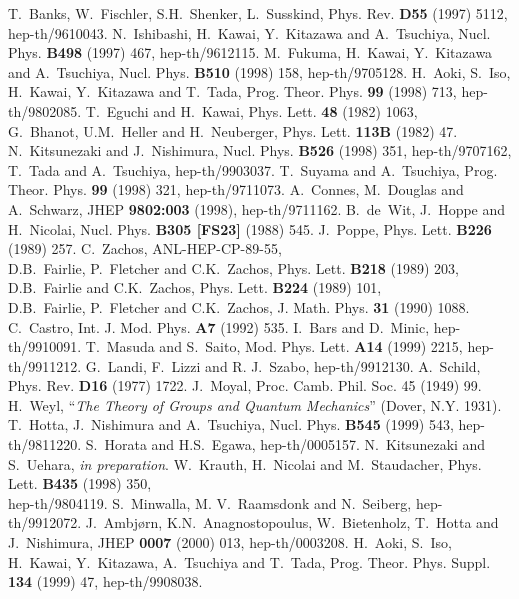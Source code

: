 \documentclass[12pt,a4paper]{article}
\begin{document}
\begin{thebibliography}{99}
 T.~Banks, W.~Fischler, S.H.~Shenker, L.~Susskind,
 Phys. Rev. {\bf D55} (1997) 5112,\\ hep-th/9610043.
 N.~Ishibashi, H.~Kawai, Y.~Kitazawa and A.~Tsuchiya,
 Nucl. Phys. {\bf B498} (1997) 467, hep-th/9612115.
 M.~Fukuma, H.~Kawai, Y.~Kitazawa and A.~Tsuchiya, Nucl. Phys.
 {\bf B510} (1998) 158, hep-th/9705128.
 H.~Aoki, S.~Iso, H.~Kawai, Y.~Kitazawa and T.~Tada,
 Prog. Theor. Phys. {\bf 99} (1998) 713, hep-th/9802085.
 T.~Eguchi and H.~Kawai, Phys. Lett. {\bf 48} (1982) 1063,\\
 G.~Bhanot, U.M.~Heller and H.~Neuberger, Phys. Lett. {\bf 113B}
 (1982) 47.
 N.~Kitsunezaki and J.~Nishimura, Nucl. Phys. {\bf B526} (1998)
 351, hep-th/9707162,\\
 T.~Tada and A.~Tsuchiya, hep-th/9903037.
 T.~Suyama and A.~Tsuchiya, Prog. Theor. Phys. {\bf 99}
 (1998) 321, hep-th/9711073.
 A.~Connes, M.~Douglas and A.~Schwarz, JHEP {\bf 9802:003} (1998),
 hep-th/9711162.
 B.~de~Wit, J.~Hoppe and H.~Nicolai, Nucl. Phys. {\bf B305 [FS23]}
 (1988) 545.
 J.~Poppe, Phys. Lett. {\bf B226} (1989) 257.
 C.~Zachos, ANL-HEP-CP-89-55,\\
 D.B.~Fairlie, P.~Fletcher and C.K.~Zachos, Phys. Lett.
 {\bf B218} (1989) 203,\\
 D.B.~Fairlie and C.K.~Zachos, Phys. Lett. {\bf B224} (1989) 101,\\
 D.B.~Fairlie, P.~Fletcher and C.K.~Zachos, J. Math. Phys.
{\bf 31} (1990) 1088.
 C.~Castro, Int. J. Mod. Phys. {\bf A7} (1992) 535.
 I.~Bars and D.~Minic, hep-th/9910091.
 T.~Masuda and S.~Saito, Mod. Phys. Lett. {\bf A14} (1999) 2215,
 hep-th/9911212.
 G.~Landi, F.~Lizzi and R. J.~Szabo, hep-th/9912130.
 A.~Schild, Phys. Rev. {\bf D16} (1977) 1722.
 J.~Moyal, Proc. Camb. Phil. Soc. {\rm 45} (1949) 99.
 H.~Weyl, ``{\it The Theory of Groups and Quantum Mechanics}''
 (Dover, N.Y. 1931).
 T.~Hotta, J.~Nishimura and A.~Tsuchiya, Nucl. Phys. {\bf B545}
 (1999) 543, hep-th/9811220.
 S.~Horata and H.S.~Egawa, hep-th/0005157.
 N.~Kitsunezaki and S.~Uehara, {\it in preparation}.
 W.~Krauth, H.~Nicolai and M.~Staudacher, Phys. Lett. {\bf B435}
(1998) 350,\\ hep-th/9804119.
 S.~Minwalla, M. V.~Raamsdonk and N.~Seiberg, hep-th/9912072.
 J.~Ambj\o rn, K.N.~Anagnostopoulus, W.~Bietenholz, T.~Hotta and
	J.~Nishimura, JHEP {\bf 0007} (2000) 013, hep-th/0003208.
 H.~Aoki, S.~Iso, H.~Kawai, Y.~Kitazawa, A.~Tsuchiya and T.~Tada,
 Prog. Theor. Phys. Suppl. {\bf 134} (1999) 47, hep-th/9908038.
\end{thebibliography}
\end{document}
